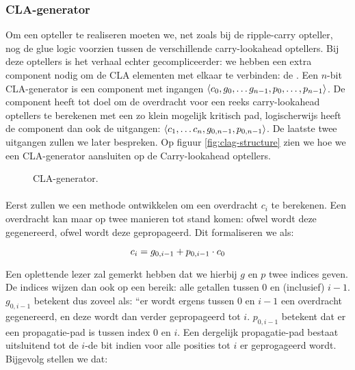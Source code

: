\subsubsection{CLA-generator}
Om een opteller te realiseren moeten we, net zoals bij de ripple-carry opteller, nog de glue logic voorzien tussen de verschillende carry-lookahead optellers. Bij deze optellers is het verhaal echter gecompliceerder: we hebben een extra component nodig om de CLA elementen met elkaar te verbinden: de . Een $n$-bit CLA-generator is een component met ingangen $\left\langle c_0,g_0,\ldots g_{n-1},p_0,\ldots,p_{n-1} \right\rangle$. De component heeft tot doel om de overdracht voor een reeks carry-lookahead optellers te berekenen met een zo klein mogelijk kritisch pad, logischerwijs heeft de component dan ook de uitgangen: $\left\langle c_1,\ldots c_n,g_{0,n-1},p_{0,n-1} \right\rangle$. De laatste twee uitgangen zullen we later bespreken. Op figuur \ref{fig:clag-structure} zien we hoe we een CLA-generator aansluiten op de Carry-lookahead optellers.

\begin{figure}[hbt]
\centering
{}
\caption{CLA-generator.}
\end{figure}

\paragraph{}
Eerst zullen we een methode ontwikkelen om een overdracht $c_i$ te berekenen. Een overdracht kan maar op twee manieren tot stand komen: ofwel wordt deze gegenereerd, ofwel wordt deze gepropageerd. Dit formaliseren we als:

\begin{equation}
c_i=g_{0,i-1}+p_{0,i-1}\cdot c_0
\eqnlab{cla-ci}
\end{equation}

Een oplettende lezer zal gemerkt hebben dat we hierbij $g$ en $p$ twee indices geven. De indices wijzen dan ook op een bereik: alle getallen tussen $0$ en (inclusief) $i-1$. $g_{0,i-1}$ betekent dus zoveel als: ``er wordt ergens tussen $0$ en $i-1$ een overdracht gegenereerd, en deze wordt dan verder gepropageerd tot $i$. $p_{0,i-1}$ betekent dat er een propagatie-pad is tussen index $0$ en $i$. Een dergelijk propagatie-pad bestaat uitsluitend tot de $i$-de bit indien voor alle posities tot $i$ er geprogageerd wordt. Bijgevolg stellen we dat:

